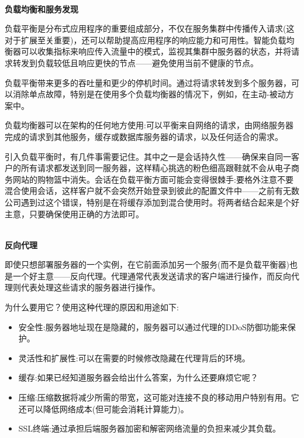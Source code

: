 \hspace*{\fill} \\ %
\noindent
\textbf{负载均衡和服务发现}

负载平衡是分布式应用程序的重要组成部分，不仅在服务集群中传播传入请求(这对于扩展至关重要)，还可以帮助提高应用程序的响应能力和可用性。智能负载均衡器可以收集指标来响应传入流量中的模式，监视其集群中服务器的状态，并将请求转发到负载较低且响应更快的节点——避免使用当前不健康的节点。

负载平衡带来更多的吞吐量和更少的停机时间。通过将请求转发到多个服务器，可以消除单点故障，特别是在使用多个负载均衡器的情况下，例如，在主动-被动方案中。

负载均衡器可以在架构的任何地方使用:可以平衡来自网络的请求，由网络服务器完成的请求到其他服务，缓存或数据库服务器的请求，以及任何适合的需求。

\begin{tcolorbox}[colback=webgreen!5!white,colframe=webgreen!75!black, title=TIP]
\hspace*{0.7cm}引入负载平衡时，有几件事需要记住。其中之一是会话持久性——确保来自同一客户的所有请求都发送到同一服务器，这样精心挑选的粉色细高跟鞋就不会从电子商务网站的购物篮中消失。会话在负载平衡方面可能会变得很棘手:要格外注意不要混合使用会话，这样客户就不会突然开始登录到彼此的配置文件中——之前有无数公司遇到过这个错误，特别是在将缓存添加到混合使用时。将两者结合起来是个好主意，只要确保使用正确的方法即可。
\end{tcolorbox}

\hspace*{\fill} \\ %
\noindent
\textbf{反向代理}

即使只想部署服务器的一个实例，在它前面添加另一个服务(而不是负载平衡器)也是一个好主意——反向代理。代理通常代表发送请求的客户端进行操作，而反向代理则代表处理这些请求的服务器进行操作。

为什么要用它？使用这种代理的原因和用途如下:

\begin{itemize}
\item 
安全性:服务器地址现在是隐藏的，服务器可以通过代理的DDoS防御功能来保护。

\item 
灵活性和扩展性:可以在需要的时候修改隐藏在代理背后的环境。

\item 
缓存:如果已经知道服务器会给出什么答案，为什么还要麻烦它呢？

\item 
压缩:压缩数据将减少所需的带宽，这可能对连接不良的移动用户特别有用。它还可以降低网络成本(但可能会消耗计算能力)。

\item 
SSL终端:通过承担后端服务器加密和解密网络流量的负担来减少其负载。
\end{itemize}


